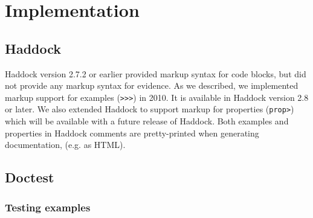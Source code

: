 \documentclass[preprint]{sigplanconf}
\begin{document}
\section{Implementation}

\subsection{Haddock}

Haddock version 2.7.2 or earlier provided markup syntax for
code blocks, but did not provide any markup syntax for evidence.
As we described, we implemented markup support for examples ({\tt >>>}) in 2010.
It is available in Haddock version 2.8 or later.
We also extended Haddock to support markup for properties ({\tt prop>}) which
will be available with a future release of Haddock.
Both examples and properties in Haddock comments are pretty-printed when
generating documentation, (e.g. as HTML).




\subsection{Doctest}
\label{sec:doctest}

\subsubsection{Testing examples}
\end{document}
